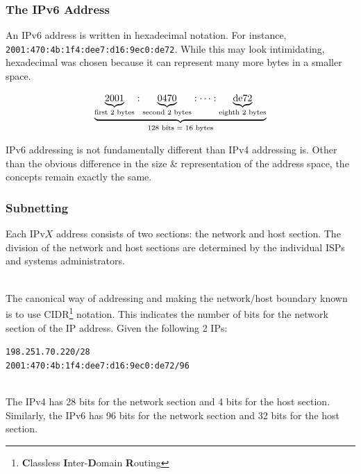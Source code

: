 \documentclass[aspectratio=169]{beamer}
\begin{document}
\begin{frame}
\frametitle{The IPv6 Address}
An IPv6 address is written in hexadecimal notation. For instance, \texttt{2001:470:4b:1f4:dee7:d16:9ec0:de72}. While this may look intimidating, hexadecimal was chosen because it can represent many more bytes in a smaller space.

\pause
\[
\underbrace{\underbrace{2001}_{\textnormal{first 2 bytes}}:\underbrace{0470}_{\textnormal{second 2 bytes}}:\dots:\underbrace{\textnormal{de72}}_{\textnormal{eighth 2 bytes}}}_{128\textnormal{ bits }=\textnormal{ 16 bytes}}
\]

\pause
IPv6 addressing is not fundamentally different than IPv4 addressing is. Other than the obvious difference in the size \& representation of the address space, the concepts remain exactly the same.
\end{frame}

\begin{frame}
\frametitle{Subnetting}
Each IPv$X$ address consists of two sections: the network and host section. The division of the network and host sections are determined by the individual ISPs and systems administrators.

\mbox{}\\
The canonical way of addressing and making the network/host boundary known is to use CIDR\footnote{\textbf{C}lassless \textbf{I}nter-\textbf{D}omain \textbf{R}outing} notation. This indicates the number of bits for the network section of the IP address. Given the following 2 IPs:

\texttt{198.251.70.220/28\\
2001:470:4b:1f4:dee7:d16:9ec0:de72/96}

\mbox{}\\
The IPv4 has 28 bits for the network section and 4 bits for the host section. Similarly, the IPv6 has 96 bits for the network section and 32 bits for the host section.
\end{frame}
\end{document}
